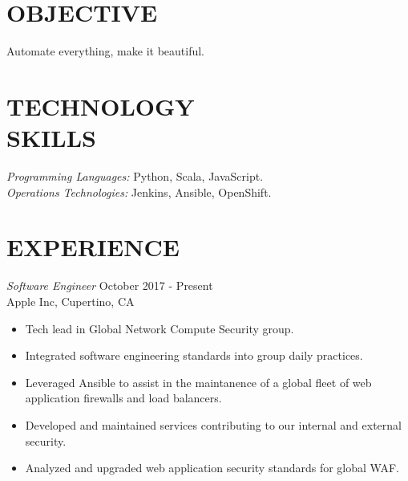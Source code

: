 \documentclass[margin, 10pt]{res} %
\begin{document}
    \begin{resume}


        \section{OBJECTIVE}

        Automate everything, make it beautiful.


        \section{TECHNOLOGY \\ SKILLS}

        {\sl Programming Languages:} Python, Scala, JavaScript. \\
        {\sl Operations Technologies:} Jenkins, Ansible, OpenShift. \\


        \section{EXPERIENCE}

        {\sl Software Engineer} \hfill October 2017 - Present \\
        Apple Inc, Cupertino, CA
        \begin{itemize}
            \item Tech lead in Global Network Compute Security group.
            \item Integrated software engineering standards into group daily practices.
            \item Leveraged Ansible to assist in the maintanence of a global fleet of web application firewalls and load balancers.
            \item Developed and maintained services contributing to our internal and external security.
            \item Analyzed and upgraded web application security standards for global WAF.
        \end{itemize}


\end{resume}
\end{document}
